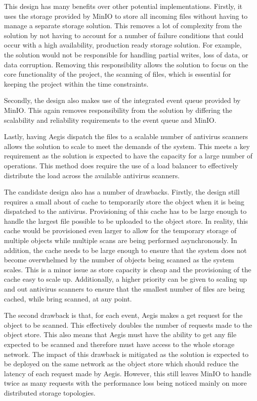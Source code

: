 \documentclass[12pt, conference, final, a4paper, onecolumn, compsoc]{IEEEtran}
\begin{document}
This design has many benefits over other potential implementations. Firstly, it
uses the storage provided by MinIO to store all incoming files without having to
manage a separate storage solution. This removes a lot of complexity from the
solution by not having to account for a number of failure conditions that could
occur with a high availability, production ready storage solution. For example,
the solution would not be responsible for handling partial writes, loss of data,
or data corruption. Removing this responsibility allows the solution to focus on
the core functionality of the project, the scanning of files, which is essential
for keeping the project within the time constraints.

Secondly, the design also makes use of the integrated event queue provided by
MinIO. This again removes responsibility from the solution by differing the
scalability and reliability requirements to the event queue and MinIO.

Lastly, having Aegis dispatch the files to a scalable number of antivirus
scanners allows the solution to scale to meet the demands of the system. This
meets a key requirement as the solution is expected to have the capacity for a
large number of operations. This method does require the use of a load balancer
to effectively distribute the load across the available antivirus scanners.

The candidate design also has a number of drawbacks. Firstly, the design still
requires a small about of cache to temporarily store the object when it is being
dispatched to the antivirus. Provisioning of this cache has to be large enough
to handle the largest file possible to be uploaded to the object store. In
reality, this cache would be provisioned even larger to allow for the temporary
storage of multiple objects while multiple scans are being performed
asynchronously. In addition, the cache needs to be large enough to ensure that
the system does not become overwhelmed by the number of objects being scanned as
the system scales. This is a minor issue as store capacity is cheap and the
provisioning of the cache easy to scale up. Additionally, a higher priority can
be given to scaling up and out antivirus scanners to ensure that the smallest
number of files are being cached, while bring scanned, at any point.

The second drawback is that, for each event, Aegis makes a get request for the
object to be scanned. This effectively doubles the number of requests made to
the object store. This also means that Aegis must have the ability to get any
file expected to be scanned and therefore must have access to the whole storage
network. The impact of this drawback is mitigated as the solution is expected to
be deployed on the same network as the object store which should reduce the
latency of each request made by Aegis. However, this still leaves MinIO to
handle twice as many requests with the performance loss being noticed mainly on
more distributed storage topologies.
\end{document}

